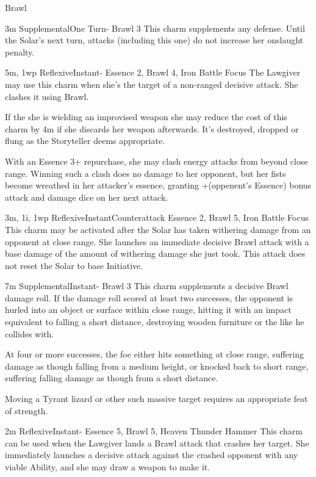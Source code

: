 \begin{Ability}{Brawl}

  {3m}
  {Supplemental}{One Turn}{-}
  {Brawl 3}
  This charm supplements any defense. Until the Solar's next turn, attacks (including this one) do not increase her onslaught penalty.

  {5m, 1wp}
  {Reflexive}{Instant}{-}
  {Essence 2, Brawl 4, Iron Battle Focus}
  The Lawgiver may use this charm when she's the target of a non-ranged decisive attack. She clashes it using Brawl.

  If the she is wielding an improvised weapon she may reduce the cost of this charm by 4m if she discards her weapon afterwards. It's destroyed, dropped or flung as the Storyteller deems appropriate.

  With an Essence 3+ repurchase, she may clash energy attacks from beyond close range. Winning such a clash does no damage to her opponent, but her fists become wreathed in her attacker's essence, granting +(oppenent's Essence) bonus attack and damage dice on her next attack.

  {3m, 1i, 1wp}
  {Reflexive}{Instant}{Counterattack}
  {Essence 2, Brawl 5, Iron Battle Focus}
  This charm may be activated after the Solar has taken withering damage from an opponent at close range. She launches an immediate decisive Brawl attack with a base damage of the amount of withering damage she just took. This attack does not reset the Solar to base Initiative.

  {7m}
  {Supplemental}{Instant}{-}
  {Brawl 3}
  This charm supplements a decisive Brawl damage roll. If the damage roll scored at least two successes, the opponent is hurled into an object or surface within close range, hitting it with an impact equivalent to falling a short distance, destroying wooden furniture or the like he collides with.

  At four or more successes, the foe either hits something at close range, suffering damage as though falling from a medium height, or knocked back to short range, suffering falling damage as though from a short distance.

  Moving a Tyrant lizard or other such massive target requires an appropriate feat of strength.

  {2m}
  {Reflexive}{Instant}{-}
  {Essence 5, Brawl 5, Heaven Thunder Hammer}
  This charm can be used when the Lawgiver lands a Brawl attack that crashes her target. She immediately launches a decisive attack against the crashed opponent with any viable Ability, and she may draw a weapon to make it.


\end{Ability}

